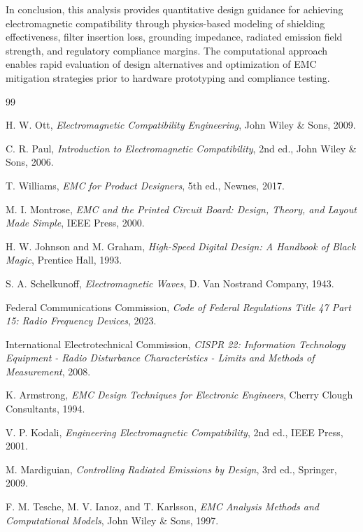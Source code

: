 \documentclass[11pt,a4paper]{article}
\begin{document}
In conclusion, this analysis provides quantitative design guidance for achieving electromagnetic compatibility through physics-based modeling of shielding effectiveness, filter insertion loss, grounding impedance, radiated emission field strength, and regulatory compliance margins. The computational approach enables rapid evaluation of design alternatives and optimization of EMC mitigation strategies prior to hardware prototyping and compliance testing.


\begin{thebibliography}{99}

 H. W. Ott, \textit{Electromagnetic Compatibility Engineering}, John Wiley \& Sons, 2009.

 C. R. Paul, \textit{Introduction to Electromagnetic Compatibility}, 2nd ed., John Wiley \& Sons, 2006.

 T. Williams, \textit{EMC for Product Designers}, 5th ed., Newnes, 2017.

 M. I. Montrose, \textit{EMC and the Printed Circuit Board: Design, Theory, and Layout Made Simple}, IEEE Press, 2000.

 H. W. Johnson and M. Graham, \textit{High-Speed Digital Design: A Handbook of Black Magic}, Prentice Hall, 1993.

 S. A. Schelkunoff, \textit{Electromagnetic Waves}, D. Van Nostrand Company, 1943.

 Federal Communications Commission, \textit{Code of Federal Regulations Title 47 Part 15: Radio Frequency Devices}, 2023.

 International Electrotechnical Commission, \textit{CISPR 22: Information Technology Equipment - Radio Disturbance Characteristics - Limits and Methods of Measurement}, 2008.

 K. Armstrong, \textit{EMC Design Techniques for Electronic Engineers}, Cherry Clough Consultants, 1994.

 V. P. Kodali, \textit{Engineering Electromagnetic Compatibility}, 2nd ed., IEEE Press, 2001.

 M. Mardiguian, \textit{Controlling Radiated Emissions by Design}, 3rd ed., Springer, 2009.

 F. M. Tesche, M. V. Ianoz, and T. Karlsson, \textit{EMC Analysis Methods and Computational Models}, John Wiley \& Sons, 1997.


\end{thebibliography}
\end{document}
